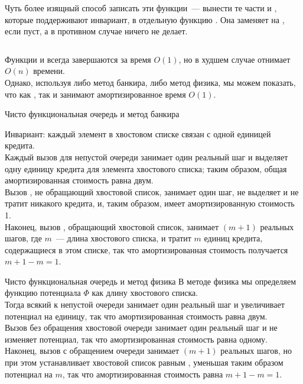 \begin{frame}[fragile]{}
Чуть более изящный способ записать эти функции~--- вынести те части
 и , которые поддерживают инвариант, в
отдельную функцию . Она заменяет  на
, если  пуст, а в противном случае
ничего не делает.

\inputminted[firstline=10,lastline=15] {haskell}{code/NaiveQueue.hs}

Функции
 и  всегда завершаются за время
$O(1)$, но  в худшем случае отнимает $O(n)$
времени. \\

Однако, используя либо метод банкира, либо метод физика, мы
можем показать, что как , так и 
занимают амортизированное время $O(1)$.

\end{frame}


\begin{frame}[fragile]{Чисто функциональная очередь и метод банкира}

Инвариант: каждый элемент в
хвостовом списке связан с одной единицей кредита. \\

Каждый вызов
 для непустой очереди занимает один реальный шаг и
выделяет одну единицу кредита для элемента хвостового списка; таким
образом, общая амортизированная стоимость равна двум. \\

Вызов
, не обращающий хвостовой список, занимает один шаг,
не выделяет и не тратит никакого кредита, и, таким образом, имеет
амортизированную стоимость 1. \\

Наконец, вызов ,
обращающий хвостовой список, занимает $(m+1)$ реальных шагов, где $m$~---
длина хвостового списка, и тратит $m$ единиц кредита, содержащиеся в
этом списке, так что амортизированная стоимость получается $m + 1 - m
= 1$.

\end{frame}


\begin{frame}[fragile]{Чисто функциональная очередь и метод физика}
В методе физика мы определяем функцию потенциала $\Phi$ как длину
хвостового списка. \\

Тогда всякий  к непустой очереди
занимает один реальный шаг и увеличивает потенциал на единицу, так что
амортизированная стоимость равна двум. \\

Вызов  без
обращения хвостовой очереди занимает один реальный шаг и не изменяет
потенциал, так что амортизированная стоимость равна одному.\\

 Наконец,
вызов  с обращением очереди занимает $(m+1)$ реальных
шагов, но при этом устанавливает хвостовой список равным \hsinline{[]},
уменьшая таким образом потенциал на $m$, так что амортизированная
стоимость равна $m + 1 - m = 1$.

\end{frame}

